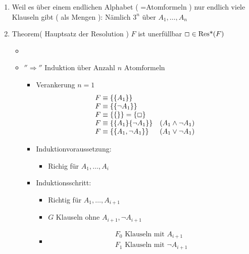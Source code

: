 \begin{enumerate}
	\item Weil es über einem endlichen Alphabet ( =Atomformeln ) nur endlich viele Klauseln gibt ( als Mengen  ): Nämlich $3^n \text{ über } A_1 , \dotsc , A_n$
	\item Theorem( Hauptsatz der Resolution ) $F$ ist unerfüllbar \gdw $\Box \in \operatorname{Res*}( F )$
	\begin{itemize}
		\item {}
		\item
			\begin{bew}
				$''\Rightarrow'' \text{ Induktion über Anzahl } n \text{ Atomformeln}$
				\begin{itemize}
					\item Verankerung $n=1$ \\
					\begin{gather*}
						\begin{array}{ l l }
							F \equiv \{ \{ A_1 \} \}									\\
							F \equiv \{ \{ \neg A_1 \} \}								\\
							F \equiv \{ \{ \} \}  = \{ \Box \}							\\
							F \equiv \{ \{ A_1 \} \{ \neg A_1 \} \}	& (A_1 \wedge \neg A_1 )	\\
							F \equiv \{ \{ A_1 , \neg A_1 \} \}		& ( A_1 \vee \neg A_1 )	
						\end{array}
					\end{gather*}
					\item Induktionvoraussetzung:
					\begin{itemize}
						\item Richig für $A_1 , \dotsc , A_i$
					\end{itemize}
					\item Induktionsschritt:
					\begin{itemize}
						\item Richtig für $A_1 , \dotsc , A_{i+1}$
						\item $G$ Klauseln ohne $A_{i+1} , \neg A_{i+1}$
						\item
							\begin{gather*}
								F_0 \text{ Klauseln mit } A_{i+1} \\
								F_1 \text{ Klauseln mit } \neg A_{i+1} \\

\end{gather*}
\end{itemize}
\end{itemize}
\end{bew}
\end{itemize}
\end{enumerate}
